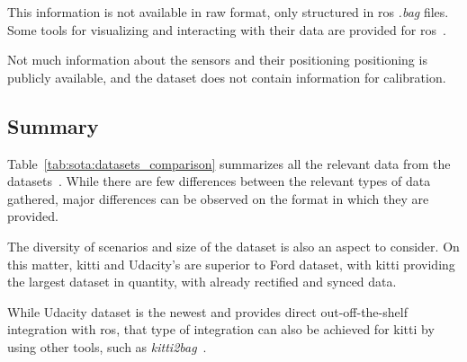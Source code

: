 This information is not available in raw format, only structured in \ac{ros} \textit{.bag} files. Some tools for visualizing and interacting with their data are provided for \ac{ros}~\cite{udacity}. 

Not much information about the sensors and their positioning positioning is publicly available, and the dataset does not contain information for calibration.

\subsection{Summary}
Table~\ref{tab:sota:datasets_comparison} summarizes all the relevant data from the datasets~\cite{udacity, Pandey2011, Geiger2013a}. While there are few differences between the relevant types of data gathered, major differences can be observed on the format in which they are provided. 

The diversity of scenarios and size of the dataset is also an aspect to consider. On this matter, \ac{kitti} and Udacity's are superior to Ford dataset, with \ac{kitti} providing the largest dataset in quantity, with already rectified and synced data. 

While Udacity dataset is the newest and provides direct out-off-the-shelf integration with \ac{ros}, that type of integration can also be achieved for \ac{kitti} by using other tools, such as \textit{kitti2bag}~\cite{TomasKrejci}. 
	
